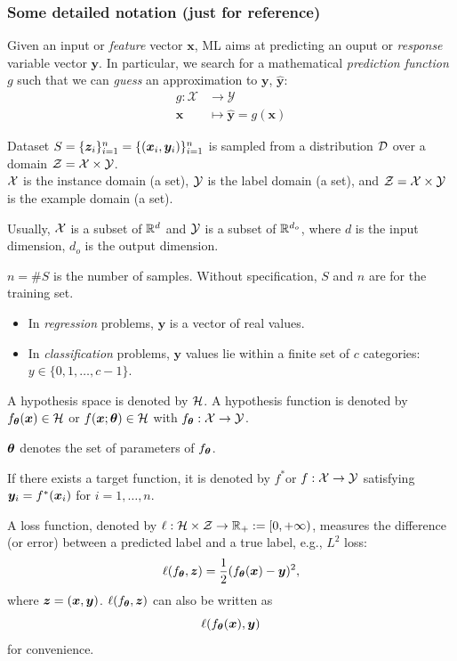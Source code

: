 \documentclass{beamer}
\begin{document}
\begin{frame}[allowframebreaks]
  \frametitle{Some detailed notation (just for reference)}

  Given an input or {\em feature} vector $\bm{x}$, ML aims at predicting an ouput or {\em response} variable vector $\bm{y}$. In particular, we search for a mathematical {\em prediction function} $g$ such that we can {\em guess} an approximation to $\bm{y}$, $\hat{\bm{y}}$:
  \begin{align*}
      g \colon \mathcal{X}  & \rightarrow \mathcal{Y}\\
      \bm{x}                &\mapsto \hat{\bm{y}}=g(\bm{x})
  \end{align*}

  \begin{definition}
    Dataset  $S=\{\bm{z}_i\}_{i=1}^n=\{(\bm{x}_i,\bm{y}_i)\}_{i=1}^n$ is sampled from a distribution $\mathcal{D}$ over a domain $\mathcal{Z}=\mathcal{X}\times\mathcal{Y}$.\\
    $\mathcal{X}$  is the instance domain (a set), $\mathcal{Y}$ is the label domain (a set), and $\mathcal{Z}=\mathcal{X}\times\mathcal{Y}$ is the example domain (a set).
  \end{definition}
  
  Usually,
  $\mathcal{X}$ is a subset of $\mathbb{R}^d$ and $\mathcal{Y}$ is a subset of $\mathbb{R}^{d_{o}}$, where $d$ is the input dimension, $d_{o}$ is the output dimension.
  
  $n=\#S$ is the number of samples. Without specification, $S$ and $n$ are for the training set.

  \begin{itemize}
    \item In {\em regression} problems, $\bm{y}$ is a vector of real values.
    \item In {\em classification} problems, $\bm{y}$ values lie within a finite set of $c$ categories: $y\in\{0, 1, \ldots, c-1\}$.
  \end{itemize}

  \begin{definition}  
  A hypothesis space is denoted by $\mathcal{H}$. A hypothesis function is denoted by $f_{\bm{\theta}}(\bm{x})\in\mathcal{H}$ or $f(\bm{x};\bm{\theta})\in\mathcal{H}$ with $f_{\bm{\theta}}:\mathcal{X}\to\mathcal{Y}$.
  \end{definition}
  
  $\bm{\theta}$  denotes the set of parameters of $f_{\bm{\theta}}$.
  
  If there exists a target function, it is denoted by $f^*$or $f:\mathcal{X}\to\mathcal{Y}$ satisfying $\bm{y}_i=f^*(\bm{x}_i)$ for $i=1,\ldots,n$.
  
  A loss function, denoted by $\ell:\mathcal{H}\times\mathcal{Z}\to\mathbb{R}_+:=[0,+\infty)$, measures the difference (or error) between a predicted label and a true label, e.g., $L^2$ loss:
  \[
      \ell(f_{\bm{\theta}},\bm{z})=\frac{1}{2}(f_{\bm{\theta}}(\bm{x})-\bm{y})^2,
  \]
  where $\bm{z}=(\bm{x},\bm{y})$. $\ell(f_{\bm{\theta}},\bm{z})$ can also be written as
  \[
      \ell(f_{\bm{\theta}}(\bm{x}),\bm{y})
  \]
  for convenience.
  

\end{frame}
\end{document}
